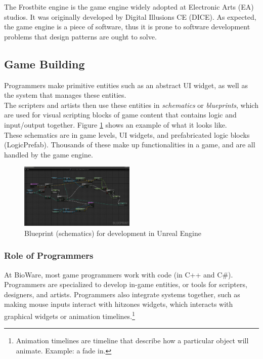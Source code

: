 \begin{multicols}{2}
The Frostbite engine is the game engine widely adopted at Electronic Arts (EA) studios. It was originally developed by Digital Illusions CE (DICE).\cite{frostbite}\cite{frostbite-wiki} As expected, the game engine is a piece of software, thus it is prone to software development problems that design patterns are ought to solve.

\subsection{Game Building}

Programmers make primitive entities such as an abstract UI widget, as well as the system that manages these entities.\bs
\\
The scripters and artists then use these entities in \textit{schematics} or \textit{blueprints}, which are used for visual scripting blocks of game content that contains logic and input/output together. Figure \ref{fig:unreal-blueprint} shows an example of what it looks like.\bs
\\
These schematics are in game levels, UI widgets, and prefabricated logic blocks (LogicPrefab). Thousands of these make up functionalities in a game, and are all handled by the game engine.

\begin{figure}[H]
	\centering
	\includegraphics[width=0.49\textwidth]{assets/unreal-blueprint}
	\caption{Blueprint (schematics) for development in Unreal Engine\cite{unity-vs-unreal}}
	\label{fig:unreal-blueprint}
\end{figure}

\subsubsection{Role of Programmers}

At BioWare, most game programmers work with code (in C++ and C\#). Programmers are specialized to develop in-game entities, or tools for scripters, designers, and artists. Programmers also integrate systems together, such as making mouse inputs interact with hitzones widgets, which interacts with graphical widgets or animation timelines.\footnote{Animation timelines are timeline that describe how a particular object will animate. Example: a fade in.}


\end{multicols}
